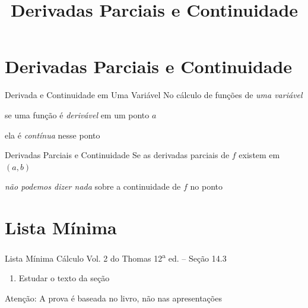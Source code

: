 \documentclass[fleqn,utf8,aspectratio=169,12pt]{beamer}
\title{Derivadas Parciais e Continuidade}
\begin{document}
\addtitle

\section{Derivadas Parciais e Continuidade}

\begin{frame}{Derivada e Continuidade em Uma Variável}
  No cálculo de funções de \emph{uma variável}

  \pause
  \medskip
  se uma função é \emph{derivável} em um ponto $a$

  \pause
  \medskip
  ela é \emph{contínua} nesse ponto
\end{frame}

\begin{frame}{Derivadas Parciais e Continuidade}
  Se as derivadas parciais de $f$ existem em $(a, b)$

  \pause
  \emph{não podemos dizer nada} sobre a continuidade de $f$ no ponto
\end{frame}



\section{Lista Mínima}

\begin{frame}{Lista Mínima}
  Cálculo Vol. 2 do Thomas 12\textsuperscript{a} ed. -- Seção 14.3
  \begin{enumerate}
    \item Estudar o texto da seção
  \end{enumerate}

  \vfill
  Atenção: A prova é baseada no livro, não nas apresentações
\end{frame}

\end{document}
